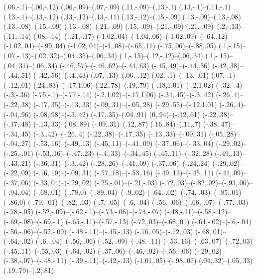 {(.06,-.1)--(.06,-.12) (.06,-.09)--(.07,-.09) (.11,-.09)--(.13,-.1) (.13,-.1)--(.11,-.1) (.13,-.1)--(.13,-.12) (.13,-.12)--(.13,-.11) (.13,-.12)--(.15,-.09) (.13,-.09)--(.13,-.08) (.13,-.08)--(.15,-.09) (.13,-.08)--(.21,-.09) (.15,-.09)--(.21,-.09) (.21,-.09)--(.2,-.13)--(.11,-.14) (.08,-.14)--(-.21,-.17) (-1.02,.04)--(-1.04,.06)--(-1.02,.09)--(-.64,.12) (-1.02,.04)--(-.99,.04) (-1.02,.04)--(-1,.08)--(-.65,.11) (-.75,.06)--(-.88,.05) (.1,-.15)--(.07,-.13)--(.02,.32)--(.04,.35)--(.06,.34) (.1,-.15)--(.12,-.12)--(.06,.34) (.1,-.15)--(.04,.31)--(.06,.34) (-.46,.57)--(-.46,.62)--(-.44,.63) (-.45,.49)--(-.44,.36) (-.42,.38)--(-.44,.51) (-.42,.56)--(-.4,.43) (.07,-.13)--(.06,-.12) (.02,-.1)--(-.13,-.01) (.07,-.1)--(-.12,.01) (.24,.83)--(-.17,1.06) (.22,.78)--(.19,.79) (-.18,1.01)--(-.2,1.02) (-.32,-.4)--(-.3,-.36) (-.75,-.1)--(-.77,-.14) (-.2,1.02)--(-.17,1.06) (-.34,.45)--(-.3,.42) (-.26,.4)--(-.22,.38) (-.17,.35)--(-.13,.33) (-.09,.31)--(-.05,.28) (-.29,.55)--(-.12,1.01) (-.26,.4)--(-.04,.96) (-.08,.98)--(-.3,.42) (-.17,.35)--(.04,.91) (0,.94)--(-.12,.61) (-.22,.38)--(-.17,.48) (-.13,.33)--(.08,.89) (-.09,.31)--(.12,.87) (.16,.84)--(.11,.7) (-.38,.47)--(-.34,.45) (-.3,.42)--(-.26,.4) (-.22,.38)--(-.17,.35) (-.13,.33)--(-.09,.31) (-.05,.28)--(-.04,.27) (-.53,.16)--(-.49,.13) (-.45,.11)--(-.41,.09) (-.37,.06)--(-.33,.04) (-.29,.02)--(-.25,-.01) (-.53,.16)--(-.47,.23) (-.4,.33)--(-.34,.45) (-.45,.11)--(-.32,.28) (-.49,.13)--(-.43,.21) (-.36,.31)--(-.3,.42) (-.28,.26)--(-.41,.09) (-.37,.06)--(-.24,.24) (-.29,.02)--(-.22,.09) (-.16,.19)--(-.09,.31) (-.57,.18)--(-.53,.16) (-.49,.13)--(-.45,.11) (-.41,.09)--(-.37,.06) (-.33,.04)--(-.29,.02) (-.25,-.01)--(-.21,-.03) (-.72,.03)--(-.82,.02)--(-.93,.06)--(-.94,.04) (-.68,.01)--(-.78,0)--(-.89,.04)--(-.9,.02) (-.64,-.02)--(-.74,-.03)--(-.85,.01)--(-.86,0) (-.79,-.01)--(-.82,-.03) (-.7,-.05)--(-.6,-.04) (-.56,-.06)--(-.66,-.07)--(-.77,-.03)--(-.78,-.05) (-.52,-.09)--(-.62,-.1)--(-.73,-.06)--(-.74,-.07) (-.48,-.11)--(-.58,-.12)--(-.69,-.08)--(-.69,-.1) (-.65,-.11)--(-.57,-.13) (-.72,.03)--(-.68,.01) (-.64,-.02)--(-.6,-.04) (-.56,-.06)--(-.52,-.09) (-.48,-.11)--(-.45,-.13) (-.76,.05)--(-.72,.03) (-.68,.01)--(-.64,-.02) (-.6,-.04)--(-.56,-.06) (-.52,-.09)--(-.48,-.11) (-.53,.16)--(-.63,.07)--(-.72,.03) (-.45,.11)--(-.55,.03)--(-.64,-.02) (-.37,.06)--(-.46,-.02)--(-.56,-.06) (-.29,.02)--(-.38,-.07)--(-.48,-.11) (-.39,-.11)--(-.42,-.13) (-1.01,.05)--(-.98,.07) (.04,.32)--(.05,.33) (.19,.79)--(.2,.81);}

